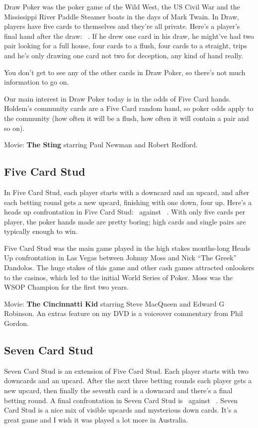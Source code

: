 Draw Poker was the poker game of the Wild West, the US Civil War and
the Mississippi River Paddle Steamer boats in the days of Mark Twain.
In Draw, players have five cards to themselves and they're
all private. Here's a player's final hand after the draw:
\back\back\back\back\back\ . If he drew one card in his draw,
he might've had two pair looking for a full house, four cards to a
flush, four cards to a straight, trips and he's only drawing one card
not two for deception, any kind of hand really.

You don't get to see any of the other cards in Draw Poker, so there's
not much information to go on.

Our main interest in Draw Poker today is in the odds of Five Card
hands. Holdem's community cards are a Five Card random hand, so poker
odds apply to the community (how often it will be a flush, how often
it will contain a pair and so on).

Movie: \textbf{The Sting} starring Paul Newman and Robert Redford.

\subsection{Five Card Stud}

In Five Card Stud, each player starts with a downcard and an upcard,
and after each betting round gets a new upcard, finishing with one
down, four up. Here's a heads up confrontation in Five Card Stud:
\back\nines\Qc\Jc\tred\ against \back\fourh\Jh\tend\trec\ . With
only five cards per player, the poker hands made are pretty boring;
high cards and single pairs are typically enough to win.

Five Card Stud was the main game played in the high stakes months-long
Heads Up confrontation in Las Vegas between Johnny Moss and Nick ``The
Greek'' Dandolos. The huge stakes of this game and other cash games
attracted onlookers to the casinos, which led to the initial World
Series of Poker. Moss was the WSOP Champion for the first two years.

Movie: \textbf{The Cincinnatti Kid} starring Steve MacQueen and Edward G
Robinson. An extras feature on my DVD is a voiceover commentary from
Phil Gordon.

\subsection{Seven Card Stud}

Seven Card Stud is an extension of Five Card Stud. Each player starts
with two downcards and an upcard. After the next three betting rounds
each player gets a new upcard, then finally the seventh card is a
downcard and there's a final betting round. A final confrontation in
Seven Card Stud is \back\back\nines\Qd\Jd\tred\back\ against
\back\back\fourh\Jh\tend\trec\back\ . Seven Card Stud is a nice mix of
visible upcards and mysterious down cards. It's a great game and I
wish it was played a lot more in Australia.

